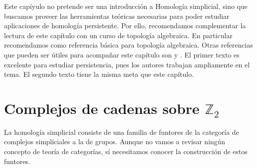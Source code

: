 \documentclass{standalone}
\begin{document}
	Este capíyulo no pretende ser una introducción a Homología simplicial, sino que buscamos proveer las herramientas teóricas necesarias para poder estudiar aplicaciones de homología persistente. Por ello, recomendamos complementar la lectura de este capítulo con un curso de topología algebraica. En particular recomendamos \cite{munkres:1984:algebraic:topology} como referencia básica para topología algebraica. Otras referencias que pueden ser útiles para acompañar este capítulo son \cite[Capítulos IV y VII]{edelsbrunner:2010:computational} y \cite{scoville:2019:discrete:morse}. El primer texto es excelente para estudiar persistencia, pues los autores trabajan ampliamente en el tema. El segundo texto tiene la misma meta que este capítulo. 
	
	\section{Complejos de cadenas sobre $\mathbb{Z}_{2}$}
	
	La homología simplicial consiste de una familia de funtores de la categoría de complejos simpliciales a la de grupos. Aunque no vamos a revisar ningún concepto de teoría de categorías, sí necesitamos conocer la construcción de estos funtores. 
	
\end{document}
